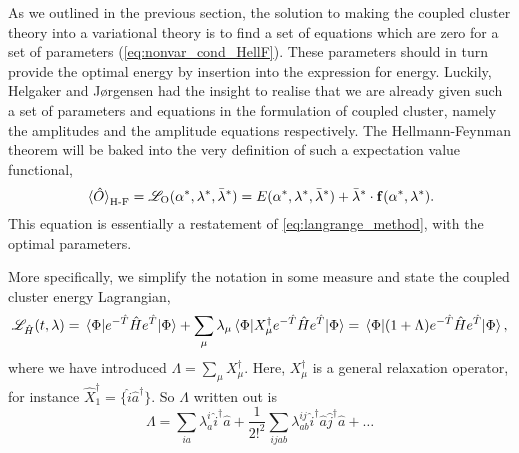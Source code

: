 As we outlined in the previous section, the solution to making the coupled cluster 
theory into a variational theory is to find a set of equations which are zero for a set
of parameters (\autoref{eq:nonvar_cond_HellF}). These parameters should in turn provide the optimal energy by insertion 
into the expression for energy. Luckily, Helgaker and 
Jørgensen\cite{helgaker1988analytical,helgaker1989configuration} had the insight to 
realise that we are already given such a set of parameters and equations in the 
formulation of coupled cluster, namely the amplitudes and the amplitude equations
respectively. The Hellmann-Feynman theorem will be baked into the very definition 
of such a expectation value functional,
\begin{equation}
    \ev*{\hat{O}}_{\text{H-F}} 
        = \mathscr{L}_{\text{O}}(\alpha^*, \vb{\lambda}^*, \bar{\vb{\lambda}}^*)
        = E(\alpha^*, \vb{\lambda}^*, \bar{\vb{\lambda}}^*)
        + \bar{\vb{\lambda}}^* \cdot \vb{f}(\alpha^*, \vb{\lambda}^*).
\end{equation}
This equation is essentially a restatement of \autoref{eq:langrange_method}, with  
the optimal parameters.

More specifically, we simplify the notation in some measure and state the coupled
cluster energy Lagrangian,
\begin{equation}
    \label{eq:cc_energy_lagrangian}
    \mathscr{L}_{\hat{H}}(t, \lambda) 
        = \mel{\Phi}{e^{-\hat{T}}\hat{H}e^{\hat{T}}}{\Phi}
        + \sum_\mu \lambda_\mu \mel{\Phi}{X_\mu^\dagger e^{-\hat{T}} \hat{H} e^{\hat{T}}}{\Phi}
        = \mel{\Phi}{(1 + \Lambda)e^{-\hat{T}}\hat{H}e^{\hat{T}} }{\Phi},
\end{equation}
where we have introduced $\Lambda = \sum_\mu X^\dagger_\mu$. Here, $X^\dagger_\mu$ is a
general relaxation operator, for instance $\hat{X}_1^\dagger = \{\hat{i}\hat{a}^\dagger\}$.
So $\Lambda$ written out is 
\begin{equation}
    \label{eq:capital_lambda}
    \Lambda = \sum_{ia}\lambda^i_a \hat{i}^\dagger \hat{a}
    + \frac{1}{2!^2}\sum_{ijab} 
        \lambda^{ij}_{ab} \hat{i}^\dagger \hat{a} \hat{j}^\dagger \hat{a}
    + \dots
\end{equation}

